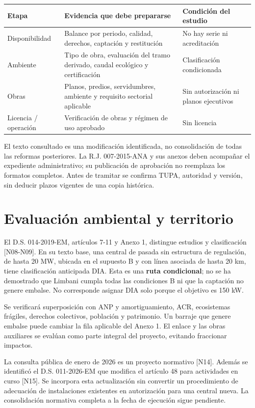 \begin{longtable}{L{3.4cm}L{6.4cm}L{4.6cm}}
\toprule Etapa & Evidencia que debe prepararse & Condición del estudio\\\midrule
Disponibilidad & Balance por periodo, calidad, derechos, captación y restitución & No hay serie ni acreditación\\
Ambiente & Tipo de obra, evaluación del tramo derivado, caudal ecológico y certificación & Clasificación condicionada\\
Obras & Planos, predios, servidumbres, ambiente y requisito sectorial aplicable & Sin autorización ni planos ejecutivos\\
Licencia / operación & Verificación de obras y régimen de uso aprobado & Sin licencia\\
\bottomrule
\end{longtable}
El texto consultado es una modificación identificada, no consolidación de todas las reformas posteriores. La R.J. 007-2015-ANA y sus anexos deben acompañar el expediente administrativo; su publicación de aprobación no reemplaza los formatos completos. Antes de tramitar se confirma TUPA, autoridad y versión, sin deducir plazos vigentes de una copia histórica.

\section{Evaluación ambiental y territorio}
El D.S. 014-2019-EM, artículos 7-11 y Anexo 1, distingue estudios y clasificación [N08-N09]. En su texto base, una central de pasada sin estructura de regulación, de hasta 20 MW, ubicada en el supuesto B y con línea asociada de hasta 20 km, tiene clasificación anticipada DIA. Esta es una \textbf{ruta condicional}; no se ha demostrado que Limbani cumpla todas las condiciones B ni que la captación no genere embalse. No corresponde asignar DIA solo porque el objetivo es 150 kW.

Se verificará superposición con ANP y amortiguamiento, ACR, ecosistemas frágiles, derechos colectivos, población y patrimonio. Un barraje que genere embalse puede cambiar la fila aplicable del Anexo 1. El enlace y las obras auxiliares se evalúan como parte integral del proyecto, evitando fraccionar impactos.

La consulta pública de enero de 2026 es un proyecto normativo [N14]. Además se identificó el D.S. 011-2026-EM que modifica el artículo 48 para actividades en curso [N15]. Se incorpora esta actualización sin convertir un procedimiento de adecuación de instalaciones existentes en autorización para una central nueva. La consolidación normativa completa a la fecha de ejecución sigue pendiente.

